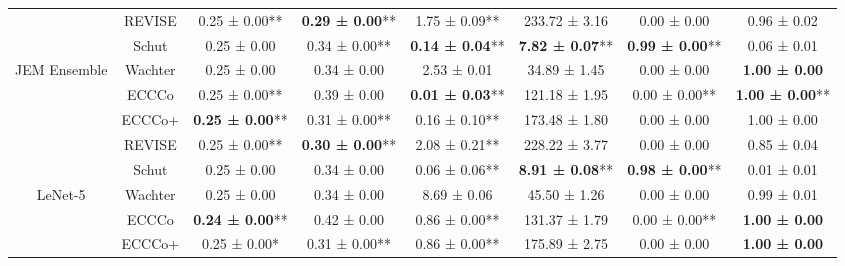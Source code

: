\begin{table}
{\begin{tabular}[t]{cccccccc}
 & REVISE & 0.25 ± 0.00** & \textbf{0.29 ± 0.00}** & 1.75 ± 0.09** & 233.72 ± 3.16\hphantom{*}\hphantom{*} & 0.00 ± 0.00\hphantom{*}\hphantom{*} & 0.96 ± 0.02\hphantom{*}\hphantom{*}\\

 & Schut & 0.25 ± 0.00\hphantom{*}\hphantom{*} & 0.34 ± 0.00** & \textbf{0.14 ± 0.04}** & \textbf{7.82 ± 0.07}** & \textbf{0.99 ± 0.00}** & 0.06 ± 0.01\hphantom{*}\hphantom{*}\\

\multirow[t]{-5}{*}{\centering\arraybackslash JEM Ensemble} & Wachter & 0.25 ± 0.00\hphantom{*}\hphantom{*} & 0.34 ± 0.00\hphantom{*}\hphantom{*} & 2.53 ± 0.01\hphantom{*}\hphantom{*} & 34.89 ± 1.45\hphantom{*}\hphantom{*} & 0.00 ± 0.00\hphantom{*}\hphantom{*} & \textbf{1.00 ± 0.00}\hphantom{*}\hphantom{*}\\
\cmidrule{1-8}
 & ECCCo & 0.25 ± 0.00** & 0.39 ± 0.00\hphantom{*}\hphantom{*} & \textbf{0.01 ± 0.03}** & 121.18 ± 1.95\hphantom{*}\hphantom{*} & 0.00 ± 0.00** & \textbf{1.00 ± 0.00}**\\

 & ECCCo+ & \textbf{0.25 ± 0.00}** & 0.31 ± 0.00** & 0.16 ± 0.10** & 173.48 ± 1.80\hphantom{*}\hphantom{*} & 0.00 ± 0.00\hphantom{*}\hphantom{*} & 1.00 ± 0.00\hphantom{*}\hphantom{*}\\

 & REVISE & 0.25 ± 0.00** & \textbf{0.30 ± 0.00}** & 2.08 ± 0.21** & 228.22 ± 3.77\hphantom{*}\hphantom{*} & 0.00 ± 0.00\hphantom{*}\hphantom{*} & 0.85 ± 0.04\hphantom{*}\hphantom{*}\\

 & Schut & 0.25 ± 0.00\hphantom{*}\hphantom{*} & 0.34 ± 0.00\hphantom{*}\hphantom{*} & 0.06 ± 0.06** & \textbf{8.91 ± 0.08}** & \textbf{0.98 ± 0.00}** & 0.01 ± 0.01\hphantom{*}\hphantom{*}\\

\multirow[t]{-5}{*}{\centering\arraybackslash LeNet-5} & Wachter & 0.25 ± 0.00\hphantom{*}\hphantom{*} & 0.34 ± 0.00\hphantom{*}\hphantom{*} & 8.69 ± 0.06\hphantom{*}\hphantom{*} & 45.50 ± 1.26\hphantom{*}\hphantom{*} & 0.00 ± 0.00\hphantom{*}\hphantom{*} & 0.99 ± 0.01\hphantom{*}\hphantom{*}\\
\cmidrule{1-8}
 & ECCCo & \textbf{0.24 ± 0.00}** & 0.42 ± 0.00\hphantom{*}\hphantom{*} & 0.86 ± 0.00** & 131.37 ± 1.79\hphantom{*}\hphantom{*} & 0.00 ± 0.00** & \textbf{1.00 ± 0.00}\hphantom{*}\hphantom{*}\\

 & ECCCo+ & 0.25 ± 0.00*\hphantom{*} & 0.31 ± 0.00** & 0.86 ± 0.00** & 175.89 ± 2.75\hphantom{*}\hphantom{*} & 0.00 ± 0.00\hphantom{*}\hphantom{*} & \textbf{1.00 ± 0.00}\hphantom{*}\hphantom{*}\\


\end{tabular}}
\end{table}
